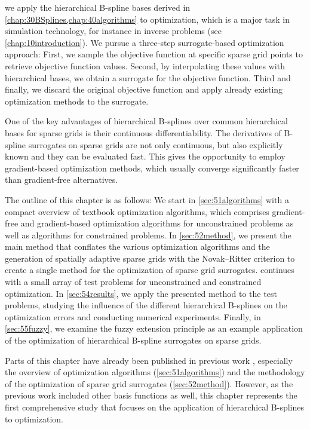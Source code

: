 
\label{chap:50optimization}

we apply the hierarchical B-spline bases derived in
\cref{chap:30BSplines,chap:40algorithms} to optimization,
which is a major task in simulation technology,
for instance in inverse problems (see \cref{chap:10introduction}).
We pursue a three-step surrogate-based optimization approach:
First, we sample the objective function at specific sparse grid points
to retrieve objective function values.
Second, by interpolating these values with hierarchical bases,
we obtain a surrogate for the objective function.
Third and finally, we discard the original objective function and apply
already existing optimization methods to the surrogate.

One of the key advantages of hierarchical B-splines
over common hierarchical bases for
sparse grids is their continuous differentiability.
The derivatives of B-spline surrogates on sparse grids are not only continuous,
but also explicitly known and they can be evaluated fast.
This gives the opportunity to employ gradient-based optimization methods,
which usually converge significantly faster than gradient-free alternatives.

The outline of this chapter is as follows:
We start in \cref{sec:51algorithms}
with a compact overview of textbook optimization algorithms,
which comprises gradient-free and gradient-based optimization algorithms
for unconstrained problems as well as algorithms for constrained problems.
In \cref{sec:52method}, we present the main method that
conflates the various optimization algorithms and
the generation of spatially adaptive sparse grids with the
Novak--Ritter criterion to create a single method for the
optimization of sparse grid surrogates.
 continues with a small array of test problems
for unconstrained and constrained optimization.
In \cref{sec:54results}, we apply the presented method
to the test problems, studying the influence of the different
hierarchical B-splines on the optimization errors and conducting
numerical experiments.
Finally, in \cref{sec:55fuzzy}, we examine the fuzzy extension principle
as an example application of the optimization of
hierarchical B-spline surrogates on sparse grids.

Parts of this chapter have already been published in previous work
\cite{Valentin14Hierarchische}, especially
the overview of optimization algorithms (\cref{sec:51algorithms})
and the methodology of the optimization of sparse grid surrogates
(\cref{sec:52method}).
However, as the previous work included other basis functions as well,
this chapter represents the first comprehensive study
that focuses on the application of hierarchical B-splines to optimization.







\cleardoublepage
